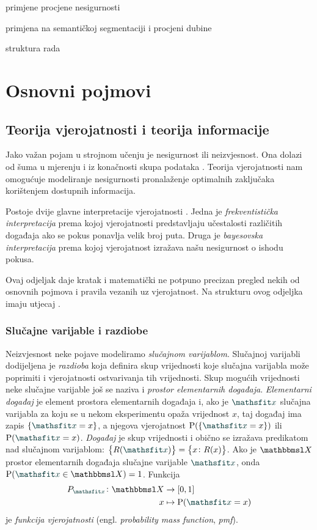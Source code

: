 \documentclass[utf8, diplomski, lmodern]{fer}
\begin{document}
primjene procjene nesigurnosti

primjena na semantičkoj segmentaciji i procjeni dubine

struktura rada



\chapter{Osnovni pojmovi} \label{chap:osnovni-pojmovi}


\section{Teorija vjerojatnosti i teorija informacije}

Jako važan pojam u strojnom učenju je nesigurnost ili neizvjesnost. Ona dolazi od šuma u mjerenju i iz konačnosti skupa podataka \citep{Bishop:2006:PRML}. Teorija vjerojatnosti nam omogućuje modeliranje nesigurnosti pronalaženje optimalnih zaključaka korištenjem dostupnih informacija.

Postoje dvije glavne interpretacije vjerojatnosti \citep{Murphy:2012:MLPP}. Jedna je \emph{frekventistička interpretacija} prema kojoj vjerojatnosti predstavljaju učestalosti različitih događaja ako se pokus ponavlja velik broj puta. Druga je \emph{bayesovska interpretacija} prema kojoj vjerojatnost izražava našu nesigurnost o ishodu pokusa. 
 
Ovaj odjeljak daje kratak i matematički ne potpuno precizan pregled nekih od osnovnih pojmova i pravila vezanih uz vjerojatnost. Na strukturu ovog odjeljka imaju utjecaj \citet{Goodfellow:2016:DL,Murphy:2012:MLPP}.

\subsection{Slučajne varijable i razdiobe}

Neizvjesnost neke pojave modeliramo \emph{slučajnom varijablom}. Slučajnoj varijabli dodijeljena je \emph{razdioba} koja definira skup vrijednosti koje slučajna varijabla može poprimiti i vjerojatnosti ostvarivanja tih vrijednosti. Skup mogućih vrijednosti neke slučajne varijable još se naziva i \emph{prostor elementarnih događaja}. \emph{Elementarni događaj} je element prostora elementarnih događaja i, ako je $\rvar x$ slučajna varijabla za koju se u nekom eksperimentu opaža vrijednost $x$, taj događaj ima zapis $\cbr{\rvar x = x}$, a njegova vjerojatnost $\P(\cbr{\rvar x = x})$ ili $\P(\rvar x = x)$. \emph{Događaj} je skup vrijednosti i obično se izražava predikatom nad slučajnom varijablom: $\cbr{R(\rvar x)}=\cbr{x\colon R(x)}$. Ako je $\set X$ prostor elementarnih događaja slučajne varijable $\rvar x$, onda $\P(\rvar x\in \set X)=1$. Funkcija 
\begin{align*}
P_{\rvar x} \colon \set X &\to \intcc{0,1} \\
x &\mapsto \P(\rvar x=x)
\end{align*}
je \emph{funkcija vjerojatnosti} (engl. \textit{probability mass function}, \textit{pmf}).
\end{document}
